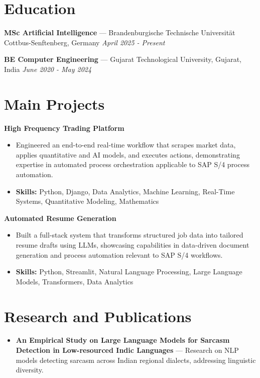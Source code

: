 \documentclass[a4paper,10pt]{article}
\begin{document}
\section*{Education}
\textbf{MSc Artificial Intelligence} — Brandenburgische Technische Universität Cottbus-Senftenberg, Germany \hfill \textit{April 2025 - Present}\par
\vspace{1.5pt}
\textbf{BE Computer Engineering} — Gujarat Technological University, Gujarat, India \hfill \textit{June 2020 - May 2024}\par

\section*{Main Projects}
\textbf{High Frequency Trading Platform}\par
\vspace{1pt}
\begin{itemize}
  \item Engineered an end-to-end real-time workflow that scrapes market data, applies quantitative and AI models, and executes actions, demonstrating expertise in automated process orchestration applicable to SAP S/4 process automation.
  \item \textbf{Skills:} Python, Django, Data Analytics, Machine Learning, Real-Time Systems, Quantitative Modeling, Mathematics
\end{itemize}
\vspace{3pt}
\textbf{Automated Resume Generation}\par
\vspace{1pt}
\begin{itemize}
  \item Built a full-stack system that transforms structured job data into tailored resume drafts using LLMs, showcasing capabilities in data-driven document generation and process automation relevant to SAP S/4 workflows.
  \item \textbf{Skills:} Python, Streamlit, Natural Language Processing, Large Language Models, Transformers, Data Analytics
\end{itemize}

\section*{Research and Publications}
\begin{itemize}
\item \textbf{An Empirical Study on Large Language Models for Sarcasm Detection in Low-resourced Indic Languages} — Research on NLP models detecting sarcasm across Indian regional dialects, addressing linguistic diversity.
\end{itemize}
\end{document}
